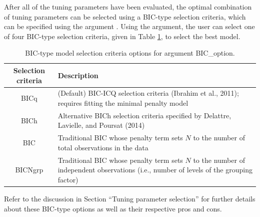 After all of the tuning parameters have been evaluated, the optimal combination of tuning parameters can be selected using a BIC-type selection criteria, which can be specified
using the  argument . Using
the  argument, the user can select one of four
BIC-type selection criteria, given in Table \ref{tab:BIC_options}, to
select the best model.

\begin{table}[h!]
  
  \centering
  \begin{tabular}{cp{4in}}
  \toprule
  Selection criteria & Description \\
  \midrule
  BICq & (Default) BIC-ICQ selection criteria (Ibrahim et al., 2011); requires fitting the minimal penalty model \\
  BICh & Alternative BICh selection criteria specified by Delattre, Lavielle, and Poursat (2014) \\
  BIC & Traditional BIC whose penalty term sets $N$ to the number of total observations in the data \\
  BICNgrp & Traditional BIC whose penalty term sets $N$ to the number of independent observations (i.e., number of levels of the grouping factor) \\
  \bottomrule
  \end{tabular}
  \caption{BIC-type model selection criteria options for argument BIC\_option.}
  \label{tab:BIC_options}
\end{table}

Refer to the discussion in Section ``Tuning parameter selection'' for further
details about these BIC-type options as well as their respective pros
and cons. 


